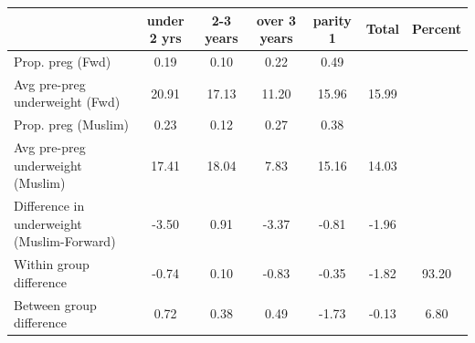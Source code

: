 \begin{tabular}{l*{6}{c}}
\toprule
            &\multicolumn{1}{c}{under 2 yrs}&\multicolumn{1}{c}{2-3 years}&\multicolumn{1}{c}{over 3 years}&\multicolumn{1}{c}{parity 1}&\multicolumn{1}{c}{Total}&\multicolumn{1}{c}{Percent}\\
\midrule
\midrule
Prop. preg (Fwd)&        0.19&        0.10&        0.22&        0.49&            &            \\
Avg pre-preg underweight (Fwd)&       20.91&       17.13&       11.20&       15.96&       15.99&            \\
Prop. preg (Muslim)&        0.23&        0.12&        0.27&        0.38&            &            \\
Avg pre-preg underweight (Muslim)&       17.41&       18.04&        7.83&       15.16&       14.03&            \\
Difference in underweight (Muslim-Forward)&       -3.50&        0.91&       -3.37&       -0.81&       -1.96&            \\
Within group difference&       -0.74&        0.10&       -0.83&       -0.35&       -1.82&       93.20\\
Between group difference&        0.72&        0.38&        0.49&       -1.73&       -0.13&        6.80\\
\bottomrule
\end{tabular}
